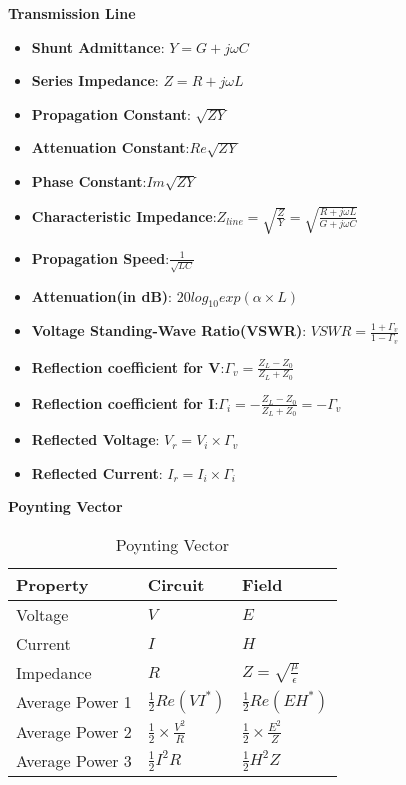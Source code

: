 \documentclass{article}
\begin{document}
  \textbf{Transmission Line}
  \begin{itemize}
  \item \textbf{Shunt Admittance}: $Y = G + j\omega C$
  \item \textbf{Series Impedance}: $Z = R + j \omega L$
  \item \textbf{Propagation Constant}: $ \sqrt{ZY}$
  \item \textbf{Attenuation Constant}:$ Re\sqrt{ZY}$
  \item \textbf{Phase Constant}:$Im\sqrt{ZY} $
  \item \textbf{Characteristic Impedance}:$Z_{line} = \sqrt{\frac{Z}{Y}} = \sqrt{\frac{R + j\omega L}{G + j\omega C}}$
  \item \textbf{Propagation Speed}:$\frac{1}{\sqrt{LC}}$
  \item \textbf{Attenuation(in dB)}: $20log_{10}exp(\alpha \times L)$
  \item \textbf{Voltage Standing-Wave Ratio(VSWR)}: $VSWR = \frac{1+\Gamma_v}{1-\Gamma_v}$
  \item \textbf{Reflection coefficient for V}:$\Gamma_v = \frac{Z_L - Z_0}{Z_L+Z_0}$
  \item \textbf{Reflection coefficient for I}:$\Gamma_i = -\frac{Z_L - Z_0}{Z_L+Z_0} = -\Gamma_v$
  
  \item \textbf{Reflected Voltage}: $V_r = V_i \times \Gamma_v$
  \item \textbf{Reflected Current}: $I_r = I_i \times \Gamma_i$
  \end{itemize}
  
  \textbf{Poynting Vector}
    \begin{table}[htpb!]
    \centering
     \caption{Poynting Vector}
     \begin{tabular}{lll}
     \hline
     Property&Circuit & Field \\ \hline \hline
     Voltage &$V$ & $E$ \\
     Current &$I$  & $H$ \\
     Impedance &$R$ & $Z = \sqrt{\frac{\mu}{\epsilon}}$ \\
     Average Power 1 &$\frac{1}{2}Re(VI^*)$ & $\frac{1}{2}Re(EH^*)$ \\
     Average Power 2 & $\frac{1}{2} \times \frac{V^2}{R}$ & $\frac{1}{2} \times \frac{E^2}{Z}$ \\
     Average Power 3 & $\frac{1}{2}I^2R$ & $\frac{1}{2}H^2Z$ \\
     
     \end{tabular}
    \end{table}
  
\end{document}
